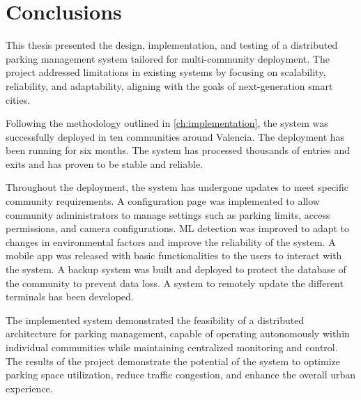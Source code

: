\chapter{Conclusions}\label{ch:conclusions}

This thesis presented the design, implementation, and testing of a distributed parking management system tailored for multi-community deployment. The project addressed limitations in existing systems by focusing on scalability, reliability, and adaptability, aligning with the goals of next-generation smart cities. 

Following the methodology outlined in \cref{ch:implementation}, the system was successfully deployed in ten communities around Valencia. The deployment has been running for six months. The system has processed thousands of entries and exits and has proven to be stable and reliable. 

Throughout the deployment, the system has undergone updates to meet specific community requirements. A configuration page was implemented to allow community administrators to manage settings such as parking limits, access permissions, and camera configurations. ML detection was improved to adapt to changes in environmental factors and improve the reliability of the system. A mobile app was released with basic functionalities to the users to interact with the system. A backup system was built and deployed to protect the database of the community to prevent data loss. A system to remotely update the different terminals has been developed. 

The implemented system demonstrated the feasibility of a distributed architecture for parking management, capable of operating autonomously within individual communities while maintaining centralized monitoring and control. The results of the project demonstrate the potential of the system to optimize parking space utilization, reduce traffic congestion, and enhance the overall urban experience.
